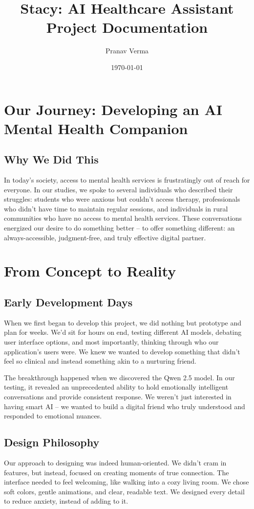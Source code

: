 \documentclass[12pt]{article}
\title{Stacy: AI Healthcare Assistant\\Project Documentation}
\author{Pranav Verma}
\date{\today}
\begin{document}
\maketitle
\tableofcontents
\newpage

\section{Our Journey: Developing an AI Mental Health Companion}

\subsection{Why We Did This}
In today's society, access to mental health services is frustratingly out of reach for everyone. In our studies, we spoke to several individuals who described their struggles: students who were anxious but couldn't access therapy, professionals who didn't have time to maintain regular sessions, and individuals in rural communities who have no access to mental health services. These conversations energized our desire to do something better – to offer something different: an always-accessible, judgment-free, and truly effective digital partner.

\section{From Concept to Reality}

\subsection{Early Development Days}
When we first began to develop this project, we did nothing but prototype and plan for weeks. We'd sit for hours on end, testing different AI models, debating user interface options, and most importantly, thinking through who our application's users were. We knew we wanted to develop something that didn't feel so clinical and instead something akin to a nurturing friend.

The breakthrough happened when we discovered the Qwen 2.5 model. In our testing, it revealed an unprecedented ability to hold emotionally intelligent conversations and provide consistent response. We weren't just interested in having smart AI – we wanted to build a digital friend who truly understood and responded to emotional nuances.

\subsection{Design Philosophy}
Our approach to designing was indeed human-oriented. We didn't cram in features, but instead, focused on creating moments of true connection. The interface needed to feel welcoming, like walking into a cozy living room. We chose soft colors, gentle animations, and clear, readable text. We designed every detail to reduce anxiety, instead of adding to it.
\end{document}
